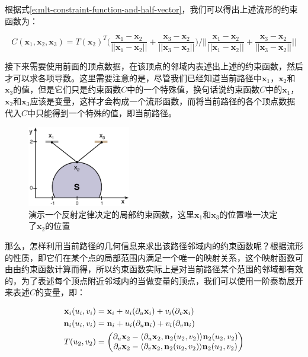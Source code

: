 \noindent 根据式\ref{e:mlt-constraint-function-and-half-vector}，我们可以得出上述流形的约束函数为：

\begin{equation}\label{e:mlt-example-c}
	C(\mathbf{x}_1,\mathbf{x}_2,\mathbf{x}_3)=T(\mathbf{x}_2)^{T}\Biggl(\frac{\mathbf{x}_1-\mathbf{x}_2}{||\mathbf{x}_1-\mathbf{x}_2||}+\frac{\mathbf{x}_3-\mathbf{x}_2}{||\mathbf{x}_3-\mathbf{x}_2||}\Biggl) \Biggl/
		\Biggl|\Biggl|\frac{\mathbf{x}_1-\mathbf{x}_2}{||\mathbf{x}_1-\mathbf{x}_2||}+\frac{\mathbf{x}_3-\mathbf{x}_2}{||\mathbf{x}_3-\mathbf{x}_2||}\Biggl|\Biggl|
\end{equation}

接下来需要使用前面的顶点数据，在该顶点的邻域内表述出上述的约束函数，然后才可以求各项导数。这里需要注意的是，尽管我们已经知道当前路径中$\mathbf{x}_1$，$\mathbf{x}_2$和$\mathbf{x}_3$的值，但是它们只是约束函数$C$中的一个特殊值，换句话说约束函数$C$中的$\mathbf{x}_1$，$\mathbf{x}_2$和$\mathbf{x}_3$应该是变量，这样才会构成一个流形函数，而将当前路径的各个顶点数据代入$C$中只能得到一个特殊的值，即当前路径。

\begin{figure}
	\sidecaption
	\includegraphics[width=0.4\textwidth]{figures/mlt/example}
	\caption{演示一个反射定律决定的局部约束函数，这里$\mathbf{x}_1$和$\mathbf{x}_3$的位置唯一决定了$\mathbf{x}_2$的位置}
	\label{f:mlt-example}
\end{figure}

那么，怎样利用当前路径的几何信息来求出该路径邻域内的约束函数呢？根据流形的性质，即它们在某个点的局部范围内满足一个唯一的映射关系，这个映射函数可由由约束函数计算而得，所以约束函数实际上是对当前路径某个范围的邻域都有效的，为了表述每个顶点附近邻域内的当做变量的顶点，我们可以使用一阶泰勒展开来表述$C$的变量，即：

\begin{equation}
\begin{aligned}
	\mathbf{x}_i(u_i,v_i)&=\mathbf{x}_i+u_i({\rm \partial}_u\mathbf{x}_i)+v_i({\rm \partial}_v\mathbf{x}_i)\\
	\mathbf{n}_i(u_i,v_i)&=\mathbf{n}_i+u_i({\rm \partial}_u\mathbf{n}_i)+v_i({\rm \partial}_v\mathbf{n}_i)\\
	T(u_2,v_2)&=\begin{pmatrix}
		{\rm \partial}_u\mathbf{x}_2-\langle{\rm \partial}_u\mathbf{x}_2,\mathbf{n}_2(u_2,v_2)\rangle\mathbf{n}_2(u_2,v_2)\\
		{\rm \partial}_v\mathbf{x}_2-\langle{\rm \partial}_v\mathbf{x}_2,\mathbf{n}_2(u_2,v_2)\rangle\mathbf{n}_2(u_2,v_2)
	\end{pmatrix}
\end{aligned}
\end{equation}

